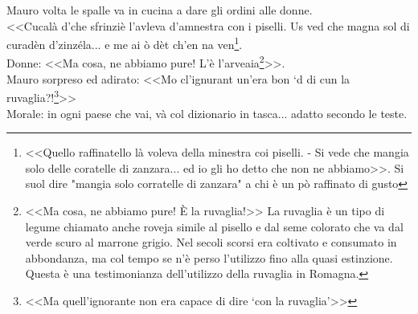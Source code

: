 \indent Mauro volta le spalle va in cucina a dare gli ordini alle donne. \\
\indent <<Cucalà d'che sfrinziè l'avleva d'amnestra con i piselli. Us ved che magna sol di curadèn d'zinzéla... e me ai ò dèt ch'en na ven\footnote{<<Quello raffinatello là voleva della minestra coi piselli. - Si vede che mangia solo delle coratelle di zanzara... ed io gli ho detto che non ne abbiamo>>. Si suol dire "mangia solo corratelle di zanzara" a chi è un pò raffinato di gusto}. \\
\indent Donne: <<Ma cosa, ne abbiamo pure! L'è l'arveaia\footnote{<<Ma cosa, ne abbiamo pure! È la ruvaglia!>> La ruvaglia è un tipo di legume chiamato anche roveja simile al pisello e dal seme colorato che va dal verde scuro al marrone grigio. Nel secoli scorsi era coltivato e consumato in abbondanza, ma col tempo se n'è perso l'utilizzo fino alla quasi estinzione. Questa è una testimonianza dell'utilizzo della ruvaglia in Romagna.}>>.\\
\indent Mauro sorpreso ed adirato: <<Mo cl'ignurant un'era bon `d di cun la ruvaglia?!\footnote{<<Ma quell'ignorante non era capace di dire `con la ruvaglia'>>}>>\\
\indent Morale: in ogni paese che vai, và col dizionario in tasca... adatto secondo le teste.

